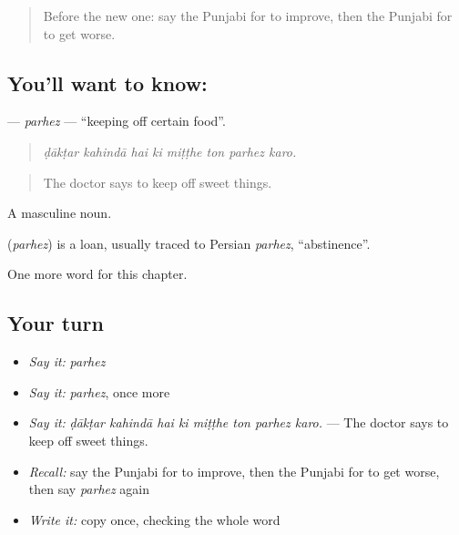 \label{lesson:PA-C325-parhez}



\begin{quote}
Before the new one: say the Punjabi for to improve, then the Punjabi for to get worse.
\end{quote}

\subsection*{You'll want to know: }
\textbf{} — \emph{parhez} — \textquotedblleft{}keeping off certain food\textquotedblright{}.

\begin{quote}
       
\end{quote}

\begin{quote}
\emph{ḍākṭar kahindā hai ki miṭṭhe ton parhez karo.}
\end{quote}

\begin{quote}
The doctor says to keep off sweet things.
\end{quote}

A masculine noun.

\begin{cousinweb}
\textbf{} (\emph{parhez}) is a loan, usually traced to Persian \emph{parhez}, \textquotedblleft{}abstinence\textquotedblright{}.
\end{cousinweb}

\begin{grammarlens}[title={What you've built}]
One more word for this chapter.
\end{grammarlens}

\subsection*{Your turn}
\begin{itemize}
\raggedright
  \item \emph{Say it:} \emph{parhez}
  \item \emph{Say it:} \emph{parhez}, once more
  \item \emph{Say it:} \emph{ḍākṭar kahindā hai ki miṭṭhe ton parhez karo.} — The doctor says to keep off sweet things.
  \item \emph{Recall:} say the Punjabi for to improve, then the Punjabi for to get worse, then say \emph{parhez} again
  \item \emph{Write it:} copy \textbf{} once, checking the whole word
\end{itemize}

